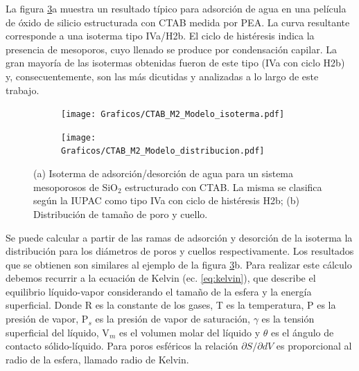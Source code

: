 		La figura \ref{fig:pea_ej}a muestra un resultado típico para adsorción de agua en una película de óxido de silicio estructurada con CTAB medida por PEA. La curva resultante corresponde a una isoterma tipo IVa/H2b. El ciclo de histéresis indica la presencia de mesoporos, cuyo llenado se produce por condensación capilar. \cite{Gregg1967}La gran mayoría de las isotermas obtenidas fueron de este tipo (IVa con ciclo H2b) y, consecuentemente, son las más dicutidas y analizadas a lo largo de este trabajo. 

			\begin{figure}[!ht]
		     	  		\begin{subfigure}[t]{0.491\textwidth}
		     	  		\texttt{[image: Graficos/CTAB\_M2\_Modelo\_isoterma.pdf]}
						\label{fig:pea_ej1}
						\end{subfigure}
						\begin{subfigure}[t]{0.495\textwidth}
		     	  		\texttt{[image: Graficos/CTAB\_M2\_Modelo\_distribucion.pdf]}
						\label{fig:pea_ej2}
						\end{subfigure}
						\vspace*{-0.6cm}
						\caption[Isoterma de adsorción/desorción tipo IVa, H2b.]{(a) Isoterma de adsorción/desorción de agua para un sistema mesoporosos de SiO$_2$ estructurado con CTAB. La misma se clasifica según la IUPAC como tipo IVa con ciclo de histéresis H2b; (b) Distribución de tamaño de poro y cuello.}
						\label{fig:pea_ej}
						\end{figure}			
		\vspace{0.3cm}				
		Se puede calcular a partir de las ramas de adsorción y desorción de la isoterma la distribución para los diámetros de poros y cuellos respectivamente. Los resultados que se obtienen son similares al ejemplo de la figura \ref{fig:pea_ej}b. Para realizar este cálculo debemos recurrir a la ecuación de Kelvin (ec. \ref{eq:kelvin}), que describe el equilibrio líquido-vapor considerando el tamaño de la esfera y la energía superficial. Donde R es la constante de los gases, T es la temperatura, P es la presión de vapor, P$_s$ es la presión de vapor de saturación, $\gamma$ es la tensión superficial del líquido, V$_m$ es el volumen molar del líquido y $\theta$ es el ángulo de contacto sólido-líquido. \cite{Baklanov2000,Boissiere2005,Sing1985} Para poros esféricos la relación $\partial S/ \partial dV$ es proporcional al radio de la esfera, llamado radio de Kelvin.\cite{FernandezPrini2005}
		
